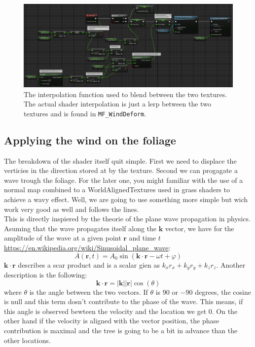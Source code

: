 \documentclass[../main.tex]{subfile}
\begin{document}
\begin{figure}[H]
    \centering
    \includegraphics[width=1\textwidth]{Ressources/AlphaInterpolation.png}
    \caption{The interpolation function used to blend between the two textures. The actual shader interpolation is just a lerp between the two textures and is
    found in \texttt{MF\_WindDeform}.}   
\end{figure}

\subsection{Applying the wind on the foliage}
The breakdown of the shader itself quit simple. First we need to displace the verticies in the direction stored at by the texture. Second we can progagate a wave trough the foliage.
For the later one, you might familiar with the use of a normal map combined to a WorldAlignedTextures used in grass shaders to achieve a wavy effect. Well, we are going to use
something more simple but wich work very good as well and follows the lines.\\

This is directly inspiered by the theorie of the plane wave propagation in physics. Asuming that the wave propagates itself along the $\bm{k}$ vector, we have 
for the amplitude of the wave at a given point $\bm{r}$ and time $t$ \url{https://en.wikipedia.org/wiki/Sinusoidal_plane_wave}:
\[
    A(\bm{r},t) = A_0 \sin(\bm{k}\cdot \bm{r} - \omega t + \varphi)
\]
$\bm{k}\cdot \bm{r}$ describes a scar product and is a scalar gien as $k_xr_x + k_yr_y + k_zr_z$. Another description is the following:
\[
    \bm{k}\cdot \bm{r} = |\bm{k}||\bm{r}|\cos(\theta)
\]
where $\theta$ is the angle between the two vectors. If $\theta$ is $90$ or $-90$ degrees, the cosine is null and this term dosn't contribute to the phase of the wave. This means,
if this angle is observed bewteen the velocity and the location we get 0. On the other hand if the velocity is aligned with the vector position, the phase contribution is maximal
and the tree  is going to be a bit in advance than the other locations.\\
\end{document}
